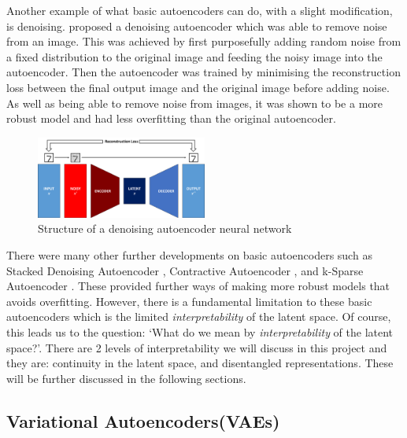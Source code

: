             Another example of what basic autoencoders can do, with a slight modification, is denoising. \cite{vincent2008extracting} proposed a denoising autoencoder which was able to remove noise from an image. This was achieved by first purposefully adding random noise from a fixed distribution to the original image and feeding the noisy image into the autoencoder. Then the autoencoder was trained by minimising the reconstruction loss between the final output image and the original image before adding noise. As well as being able to remove noise from images, it was shown to be a more robust model and had less overfitting than the original autoencoder.
            
            \begin{figure}[H] \label{fig:dae}
                \centering
                \includegraphics[width=0.5\textwidth]{imgs/denoising_ae.png}
                \caption{Structure of a denoising autoencoder neural network}
            \end{figure}
            
            There were many other further developments on basic autoencoders such as Stacked Denoising Autoencoder \citep{vincent2010stacked}, Contractive Autoencoder \citep{rifai2011higher}, and k-Sparse Autoencoder \citep{makhzani2013k}. These provided further ways of making more robust models that avoids overfitting. However, there is a fundamental limitation to these basic autoencoders which is the limited \textit{interpretability} of the latent space. Of course, this leads us to the question: `What do we mean by \textit{interpretability} of the latent space?'. There are 2 levels of interpretability we will discuss in this project and they are: continuity in the latent space, and disentangled representations. These will be further discussed in the following sections.
            
        \subsection{Variational Autoencoders(VAEs)}
